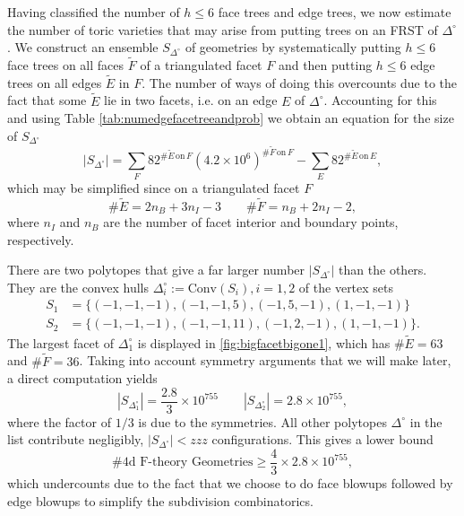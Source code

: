 \documentclass[aps,prl,twocolumn, superscriptaddress,groupedaddress,nofootinbib]{revtex4}
\newcommand{\sdoc}{S_{\Delta_1^\circ}}
\newcommand{\sdtc}{S_{\Delta_2^\circ}}
\begin{document}
\vspace{.5cm}
Having classified the number of $h\leq 6$ face trees and edge trees, we now estimate 
the number of toric varieties that may arise from putting trees on an FRST of 
$\Delta^\circ$. 
We construct an ensemble $S_{\Delta^\circ}$ of geometries by systematically putting $h\leq 6$ face trees on all
faces $\tilde F$ of a triangulated facet $F$ and then putting $h\leq 6$ edge trees on
all edges $\tilde E$ in $F$. The number of ways of doing this overcounts
due to the fact that some
$\tilde E$ lie in two facets, i.e. on an edge $E$ of $\Delta^\circ$. Accounting
for this and using Table \ref{tab:numedgefacetreeandprob} we obtain an equation for the size of $S_{\Delta^\circ}$
\begin{equation}
|S_{\Delta^\circ}| = \sum_F 82^{\# \tilde E \, \text{on} \, F} (4.2\times 10^6)^{\# \tilde F \, \text{on} \, F} - \sum_E 82^{\# \tilde E \, \text{on} \, E},
\end{equation}
which may be simplified since on a triangulated facet $F$
\begin{equation}
\#\tilde E = 2n_B + 3n_I - 3 \qquad \# \tilde F = n_B+2n_I-2,
\end{equation}
where $n_I$ and $n_B$ are the number of facet interior and boundary points,
respectively. 

There are two polytopes that give a far larger number $|S_{\Delta^\circ}|$
than the others. They
are  the convex hulls $\Delta_i^\circ := \text{Conv}(S_i), i=1,2$ of the
vertex sets
\begin{align} 
S_1 &= \{ (-1,-1,-1),(-1,-1,5),(-1,5,-1),(1,-1,-1)\} \nonumber \\
S_2 &= \{ (-1,-1,-1),(-1,-1,11),(-1,2,-1),(1,-1,-1)\}.
\end{align}
The largest facet of $\Delta_1^\circ$ is displayed in \ref{fig:bigfacetbigone1}, 
which has $\# \tilde E = 63$ and $\# \tilde F=36$. Taking into
account symmetry arguments that we will make later, a 
direct computation
yields
\begin{equation}
|\sdoc| = \frac{2.8}{3} \times 10^{755} \qquad |\sdtc| = 2.8 \times 10^{755},
\label{eqn:sdocsdtccounts}
\end{equation}
where the factor of $1/3$ is due to the symmetries.
All other polytopes $\Delta^\circ$ in the list contribute negligibly, 
$|S_{\Delta^\circ}| < zzz$
configurations. This gives a lower bound
\begin{equation}
\text{\# 4d F-theory Geometries} \geq \frac43 \times 2.8 \times 10^{755},
\end{equation}
which undercounts due to the fact that we choose to do face blowups followed by
edge blowups to simplify the subdivision combinatorics.
\end{document}
